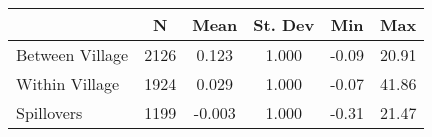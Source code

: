 \begin{tabular}{l*{5}{c}}\hline&\multicolumn{1}{c}{N}&\multicolumn{1}{c}{Mean}&\multicolumn{1}{c}{St. Dev}&\multicolumn{1}{c}{Min}&\multicolumn{1}{c}{Max}\\ \hline 
Between Village & 2126 & 0.123 & 1.000 & -0.09 & 20.91 \\
Within Village & 1924 & 0.029 & 1.000 & -0.07 & 41.86 \\
Spillovers & 1199 & -0.003 & 1.000 & -0.31 & 21.47 \\
\hline \end{tabular}
